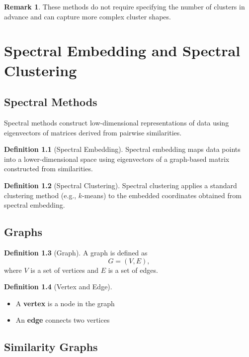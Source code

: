 \documentclass[12pt,oneside]{book}
\numberwithin{equation}{section}
\theoremstyle{definition}
\newtheorem{definition}{Definition}[section]
\newtheorem{remark}{Remark}[section]
\theoremstyle{plain}
\theoremstyle{remark}
\begin{document}
\begin{remark}
These methods do not require specifying the number of clusters in advance and can capture more complex cluster shapes.
\end{remark}

\chapter{Spectral Embedding and Spectral Clustering}

\section{Spectral Methods}

Spectral methods construct low-dimensional representations of data using eigenvectors of matrices derived from pairwise similarities.

\begin{definition}[Spectral Embedding]
Spectral embedding maps data points into a lower-dimensional space using eigenvectors of a graph-based matrix constructed from similarities.
\end{definition}

\begin{definition}[Spectral Clustering]
Spectral clustering applies a standard clustering method (e.g., $k$-means) to the embedded coordinates obtained from spectral embedding.
\end{definition}

\section{Graphs}

\begin{definition}[Graph]
A graph is defined as
\[
G=(V,E),
\]
where $V$ is a set of vertices and $E$ is a set of edges.
\end{definition}

\begin{definition}[Vertex and Edge]
\begin{itemize}
    \item A \textbf{vertex} is a node in the graph
    \item An \textbf{edge} connects two vertices
\end{itemize}
\end{definition}

\section{Similarity Graphs}
\end{document}
